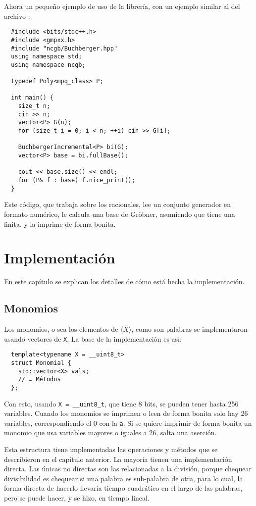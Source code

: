 \documentclass[12pt]{report}
\theoremstyle{customstyle}
\theoremstyle{factstyle}
\begin{document}
Ahora un pequeño ejemplo de uso de la librería, con un ejemplo similar al del archivo :

\begin{verbatim}
  #include <bits/stdc++.h>
  #include <gmpxx.h>
  #include "ncgb/Buchberger.hpp"
  using namespace std;
  using namespace ncgb;

  typedef Poly<mpq_class> P;

  int main() {
    size_t n;
    cin >> n;
    vector<P> G(n);
    for (size_t i = 0; i < n; ++i) cin >> G[i];

    BuchbergerIncremental<P> bi(G);
    vector<P> base = bi.fullBase();

    cout << base.size() << endl;
    for (P& f : base) f.nice_print();
  }
\end{verbatim}

Este código, que trabaja sobre los racionales, lee un conjunto generador en formato numérico, le calcula una base de Gröbner, asumiendo que tiene una finita, y la imprime de forma bonita.


\chapter{Implementación}\label{cap:Implementación}

En este capítulo se explican los detalles de cómo está hecha la implementación.

\section{Monomios}

Los monomios, o sea los elementos de $⟨X⟩$, como son palabras se implementaron usando vectores de \texttt{X}. La base de la implementación es así:

\begin{verbatim}
  template<typename X = __uint8_t>
  struct Monomial {
    std::vector<X> vals;
    // … Métodos
  };
\end{verbatim}

Con esto, usando \texttt{X = \_\_uint8\_t}, que tiene 8 bits, se pueden tener hasta 256 variables. Cuando los monomios se imprimen o leen de forma bonita solo hay 26 variables, correspondiendo el 0 con la \texttt{a}. Si se quiere imprimir de forma bonita un monomio que usa variables mayores o iguales a 26, salta una aserción.

Esta estructura tiene implementadas las operaciones y métodos que se describieron en el capítulo anterior. La mayoría tienen una implementación directa. Las únicas no directas son las relacionadas a la división, porque chequear divisibilidad es chequear si una palabra es sub-palabra de otra, para lo cual, la forma directa de hacerlo llevaría tiempo cuadrático en el largo de las palabras, pero se puede hacer, y se hizo, en tiempo lineal.
\end{document}
